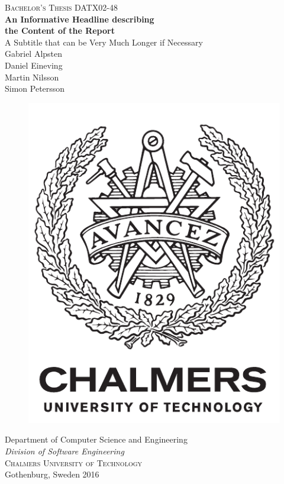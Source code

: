 \newpage
\thispagestyle{empty}
\begin{center}
	\textsc{\large Bachelor's Thesis DATX02-48 }\\[4cm]		%
	\textbf{\Large An Informative Headline describing\\ the Content of the Report} \\[1cm]
	{\large A Subtitle that can be Very Much Longer if Necessary}\\[1cm]
	{\large Gabriel Alpsten}\\
	{\large Daniel Eineving}\\
	{\large Martin Nilsson}\\
	{\large Simon Petersson}
	
	\vfill	
	\begin{figure}[H]
	\centering
	\includegraphics[width=0.2\pdfpagewidth]{report/images/auxiliary/logo_eng.pdf} \\	
	\end{figure}	\vspace{5mm}	

	Department of Computer Science and Engineering \\
	\emph{Division of Software Engineering}\\
	\textsc{Chalmers University of Technology} \\
	Gothenburg, Sweden 2016 \\
\end{center}


